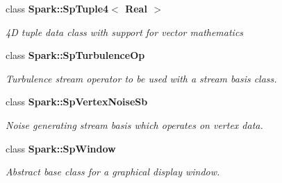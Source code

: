\begin{CompactItemize}
class {\bf Spark::Sp\-Tuple4$<$ Real $>$}
\begin{CompactList}\small\item\em 4D tuple data class with support for vector mathematics \item\end{CompactList}\item 
class {\bf Spark::Sp\-Turbulence\-Op}
\begin{CompactList}\small\item\em Turbulence stream operator to be used with a stream basis class. \item\end{CompactList}\item 
class {\bf Spark::Sp\-Vertex\-Noise\-Sb}
\begin{CompactList}\small\item\em Noise generating stream basis which operates on vertex data. \item\end{CompactList}\item 
class {\bf Spark::Sp\-Window}
\begin{CompactList}\small\item\em Abstract base class for a graphical display window. \item\end{CompactList}\end{CompactItemize}
